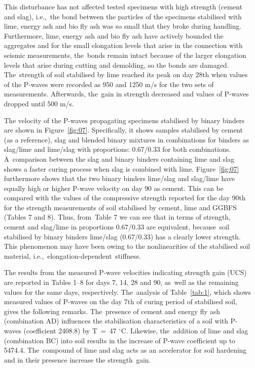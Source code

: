 \documentclass[materials,article,accept,pdftex,moreauthors]{Definitions/mdpi}
\begin{document}
This disturbance has not affected tested specimens with high strength (cement and slag), i.e.,~the bond between the particles of the specimens stabilised with lime, energy ash and bio fly ash was so small that they broke during handling. Furthermore, lime, energy ash and bio fly ash have actively bounded the aggregates and for the small elongation levels that arise in the connection with seismic measurements, the~bonds remain intact because of the larger elongation levels that arise during cutting and demolding, so the bonds are damaged. The~strength of soil stabilised by lime reached its peak on day 28th when values of the P-waves were recorded as 950 and 1250 m/s for the two sets of measurements. Afterwards, the~gain in strength decreased and values of P-waves dropped until 500 m/s. 

The velocity of the P-waves propagating specimens stabilised by binary binders are shown in Figure~\ref{fig:07}. Specifically, it shows samples stabilised by cement (as a reference), slag and blended binary mixtures in combinations for binders as slag/lime and lime/slag with proportions: 0.67/0.33 for both combinations. A~comparison between the slag and binary binders containing lime and slag shows a faster curing process when slag is combined with lime. Figure~\ref{fig:07} furthermore shows that the two binary binders lime/slag and slag/lime have equally high or higher P-wave velocity on day 90 as cement. This can be compared with the values of the compressive strength reported for the day {90}th for the strength measurements of soil stabilised by cement, lime and GGBFS (Tables 7 and 8). Thus, from~Table 7 we can see that in terms of strength, cement and slag/lime in proportions 0.67/0.33 are equivalent, because~soil stabilised by binary binders lime/slag (0.67/0.33) has a clearly lower strength. This phenomenon may have been owing to the nonlinearities of the stabilised soil material, i.e.,~elongation-dependent~stiffness.


The results from the measured P-wave velocities indicating strength gain (UCS) are reported in Tables 1--8 for days 7, 14, 28 and 90, as~well as the remaining values for the same days, respectively. The~analysis of Table~\ref{tab:1}, which shows measured values of P-waves on the day 7th of curing period of stabilised soil, gives the following remarks. The~presence of cement and energy fly ash (combination AD) influences the stabilisation characteristics of a soil with P-waves (coefficient 2408.8) by T~=~47 $^\circ$C. Likewise, the~addition of lime and slag (combination BC) into soil results in the increase of P-wave coefficient up to 5474.4. The~compound of lime and slag acts as an accelerator for soil hardening and in their presence increase the strength~gain. 
\end{document}
